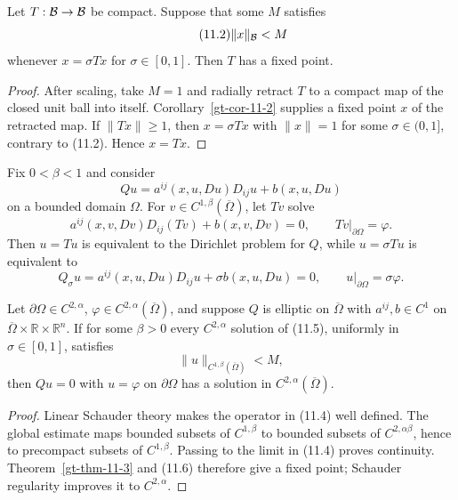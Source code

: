 \begin{theorem}
\label{gt-thm-11-3}


Let $T:\mathcal{B}\to\mathcal{B}$ be compact. Suppose that some $M$ satisfies
\begin{equation}
\tag{11.2}
\|x\|_{\mathcal{B}}<M
\end{equation}
whenever $x=\sigma Tx$ for $\sigma\in[0,1]$. Then $T$ has a fixed point.
\end{theorem}
\begin{proof}
\sketch After scaling, take $M=1$ and radially retract $T$ to a compact map
of the closed unit ball into itself. Corollary~\ref{gt-cor-11-2} supplies a
fixed point $x$ of the retracted map. If $\|Tx\|\geq1$, then
$x=\sigma Tx$ with $\|x\|=1$ for some $\sigma\in(0,1]$, contrary to (11.2).
Hence $x=Tx$.
\end{proof}

Fix $0<\beta<1$ and consider
\begin{equation}
\tag{11.3}
Qu=a^{ij}(x,u,Du)D_{ij}u+b(x,u,Du)
\end{equation}
on a bounded domain $\Omega$. For $v\in C^{1,\beta}(\overline\Omega)$,
let $Tv$ solve
\begin{equation}
\tag{11.4}
a^{ij}(x,v,Dv)D_{ij}(Tv)+b(x,v,Dv)=0,
\qquad Tv|_{\partial\Omega}=\varphi.
\end{equation}
Then $u=Tu$ is equivalent to the Dirichlet problem for $Q$, while
$u=\sigma Tu$ is equivalent to
\begin{equation}
\tag{11.5}
Q_\sigma u=a^{ij}(x,u,Du)D_{ij}u+\sigma b(x,u,Du)=0,
\qquad u|_{\partial\Omega}=\sigma\varphi.
\end{equation}

\begin{theorem}
\label{gt-thm-11-4}


Let $\partial\Omega\in C^{2,\alpha}$,
$\varphi\in C^{2,\alpha}(\overline\Omega)$, and suppose $Q$ is elliptic on
$\overline\Omega$ with $a^{ij},b\in C^1$ on
$\overline\Omega\times\mathbb R\times\mathbb R^n$. If for some $\beta>0$
every $C^{2,\alpha}$ solution of (11.5), uniformly in $\sigma\in[0,1]$,
satisfies
\begin{equation}
\tag{11.6}
\|u\|_{C^{1,\beta}(\overline\Omega)}<M,
\end{equation}
then $Qu=0$ with $u=\varphi$ on $\partial\Omega$ has a solution in
$C^{2,\alpha}(\overline\Omega)$.
\end{theorem}
\begin{proof}
\sketch Linear Schauder theory makes the operator in (11.4) well defined.
The global estimate maps bounded subsets of $C^{1,\beta}$ to bounded subsets
of $C^{2,\alpha\beta}$, hence to precompact subsets of $C^{1,\beta}$.
Passing to the limit in (11.4) proves continuity. Theorem~\ref{gt-thm-11-3}
and (11.6) therefore give a fixed point; Schauder regularity improves it to
$C^{2,\alpha}$.
\end{proof}

